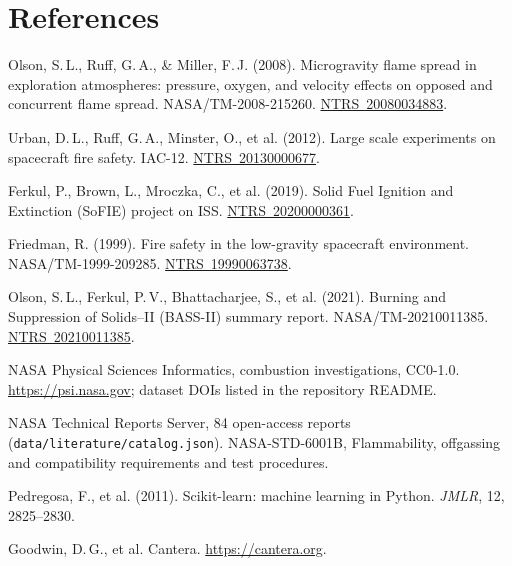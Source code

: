 \documentclass[10pt,letterpaper]{article}
\newcommand{\ntrs}[1]{\href{https://ntrs.nasa.gov/citations/#1}{NTRS~#1}}
\begin{document}
\section*{References}
{\small
\begin{enumerate}[label={[\arabic*]},leftmargin=2em,itemsep=2pt]
\item Olson, S.\,L., Ruff, G.\,A., \& Miller, F.\,J. (2008). Microgravity flame spread in exploration atmospheres: pressure, oxygen, and velocity effects on opposed and concurrent flame spread. NASA/TM-2008-215260. \ntrs{20080034883}.
\item Urban, D.\,L., Ruff, G.\,A., Minster, O., et al. (2012). Large scale experiments on spacecraft fire safety. IAC-12. \ntrs{20130000677}.
\item Ferkul, P., Brown, L., Mroczka, C., et al. (2019). Solid Fuel Ignition and Extinction (SoFIE) project on ISS. \ntrs{20200000361}.
\item Friedman, R. (1999). Fire safety in the low-gravity spacecraft environment. NASA/TM-1999-209285. \ntrs{19990063738}.
\item Olson, S.\,L., Ferkul, P.\,V., Bhattacharjee, S., et al. (2021). Burning and Suppression of Solids--II (BASS-II) summary report. NASA/TM-20210011385. \ntrs{20210011385}.
\item NASA Physical Sciences Informatics, combustion investigations, CC0-1.0. \url{https://psi.nasa.gov}; dataset DOIs listed in the repository README.
\item NASA Technical Reports Server, 84 open-access reports (\texttt{data/literature/catalog.json}). NASA-STD-6001B, Flammability, offgassing and compatibility requirements and test procedures.
\item Pedregosa, F., et al. (2011). Scikit-learn: machine learning in Python. \emph{JMLR}, 12, 2825--2830.
\item Goodwin, D.\,G., et al. Cantera. \url{https://cantera.org}.
\end{enumerate}}
\end{document}
